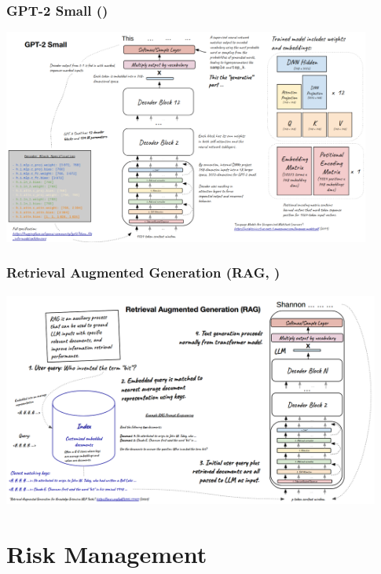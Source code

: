 \documentclass[11pt,
               aspectratio=169,
               hyperref={colorlinks}
               ]{beamer}
\begin{document}
		\begin{frame}
			\frametitle{GPT-2 Small (\cite{radford2019language})}
			\centering
			\includegraphics[height=200pt]{../img/gpt2.png}
		\end{frame}	

		\begin{frame}
			\frametitle{Retrieval Augmented Generation (RAG, \cite{lewis2020retrieval})}
			\centering
			\includegraphics[height=200pt]{../img/rag.png}
		\end{frame}	
		
	\section{Risk Management}
		\subsection*{} %
\end{document}
